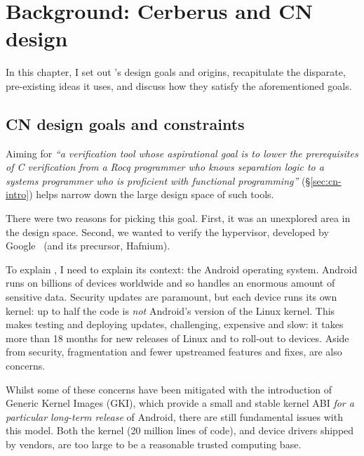 \chapter{Background: Cerberus and CN design}%
\label{chap:formal-background}

\margintoc{}

In this chapter, I set out 's design goals and origins, recapitulate the
disparate, pre-existing ideas it uses, and discuss how they satisfy the
aforementioned goals.

\section{CN design goals and constraints}%
\label{sec:cn-goals}

Aiming for \emph{``a verification tool whose aspirational goal is to lower the
prerequisites of C verification from a Rocq programmer who knows separation logic to a
systems programmer who is proficient with functional programming''}
(\S\ref{sec:cn-intro}) helps narrow down the large design space of such
tools.

There were two reasons for picking this goal. First, it was an unexplored area
in the design space. Second, we wanted to verify the  hypervisor, developed
by Google~\cite{deacon2020virtualization} (and its precursor, Hafnium).

To explain , I need to explain its context: the Android operating
system. Android runs on billions of devices worldwide and so handles an
enormous amount of sensitive data. Security updates are paramount, but each
device runs its own kernel: up to half the code is \emph{not} Android's version
of the Linux kernel. This makes testing and deploying updates, challenging,
expensive and slow: it takes more than 18 months for new releases of Linux and
to roll-out to devices. Aside from security, fragmentation and fewer
upstreamed features and fixes, are also concerns.


Whilst some of these concerns have been mitigated with the introduction of
Generic Kernel Images
(GKI),
which provide a small and stable kernel ABI \emph{for a particular long-term
release} of Android, there are still fundamental issues with this model. Both
the kernel (20 million lines of code), and device drivers shipped by vendors,
are too large to be a reasonable trusted computing base.

